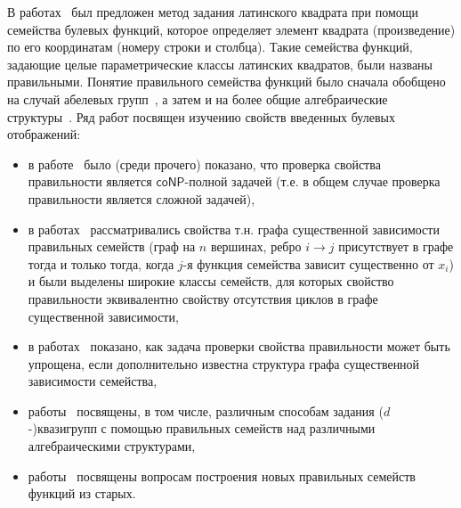     В работах~\cite{nosov98, nosov99} был предложен метод задания латинского квадрата при помощи семейства булевых функций, которое определяет элемент квадрата (произведение) по его координатам (номеру строки и столбца).
    Такие семейства функций, задающие целые параметрические классы латинских квадратов, были названы правильными.
    Понятие правильного семейства функций было сначала обобщено на случай абелевых групп~\cite{nosov06, nosov06abel, nosov07, nosov08, kozlov08}, а затем и на более общие алгебраические структуры~\cite{plaksina14, galatenko2020latin, galatenko23}.
    Ряд работ посвящен изучению свойств введенных булевых отображений:
    \begin{itemize}
        \item в работе~\cite{nosov98} было (среди прочего) показано, что проверка свойства правильности является $\mathsf{coNP}$-полной задачей (т.е. в общем случае проверка правильности является сложной задачей),
        \item в работах~\cite{nosov07, nosov08, kozlov08} рассматривались свойства т.н. графа существенной зависимости правильных семейств (граф на $n$ вершинах, ребро $ i \to j$ присутствует в графе тогда и только тогда, когда $j$-я функция семейства зависит существенно от $x_i$) и были выделены широкие классы семейств, для которых свойство правильности эквивалентно свойству отсутствия циклов в графе существенной зависимости,
        \item в работах~\cite{rykov10, rykov14} показано, как задача проверки свойства правильности может быть упрощена, если дополнительно известна структура графа существенной зависимости семейства,
        \item работы~\cite{plaksina14, galatenko2020latin, galatenko23} посвящены, в том числе, различным способам задания ($d$-)квазигрупп с помощью правильных семейств над различными алгебраическими структурами,
        \item работы~\cite{galatenko21generation, galatenko2022generation} посвящены вопросам построения новых правильных семейств функций из старых.
    \end{itemize}

